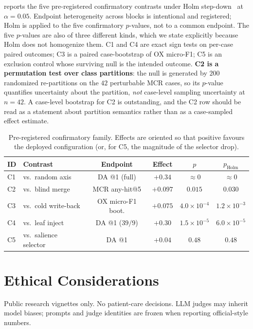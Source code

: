  reports the five pre-registered confirmatory contrasts under Holm step-down~\cite{holm1979} at $\alpha{=}0.05$.
Endpoint heterogeneity across blocks is intentional and registered; Holm is applied to the five confirmatory $p$-values, not to a common endpoint.
The five $p$-values are also of three different kinds, which we state explicitly because Holm does not homogenize them.
C1 and C4 are exact sign tests on per-case paired outcomes; C3 is a paired case-bootstrap of OX micro-F1; C5 is an exclusion control whose surviving null is the intended outcome.
\textbf{C2 is a permutation test over class partitions}: the null is generated by $200$ randomized re-partitions on the $42$ perturbable MCR cases, so its $p$-value quantifies uncertainty about the partition, \emph{not} case-level sampling uncertainty at $n{=}42$.
A case-level bootstrap for C2 is outstanding, and the C2 row should be read as a statement about partition semantics rather than as a case-sampled effect estimate.

\begin{table}[t]
\centering
\small
\caption{Pre-registered confirmatory family. Effects are oriented so that positive favours the deployed configuration (or, for C5, the magnitude of the selector drop).}
\label{tab:holm5}
\begin{tabular}{llcccc}
\toprule
ID & Contrast & Endpoint & Effect & $p$ & $p_{\mathrm{Holm}}$ \\
\midrule
C1 & vs.\ random axis & DA @1 (full) & $+0.34$ & ${\approx}0$ & ${\approx}0$ \\
C2 & vs.\ blind merge & MCR any-hit@5 & $+0.097$ & $0.015$ & $0.030$ \\
C3 & vs.\ cold write-back & OX micro-F1 boot. & $+0.075$ & $4.0{\times}10^{-4}$ & $1.2{\times}10^{-3}$ \\
C4 & vs.\ leaf inject & DA @1 ($39/9$) & $+0.30$ & $1.5{\times}10^{-5}$ & $6.0{\times}10^{-5}$ \\
C5 & vs.\ salience selector & DA @1 & $+0.04$ & $0.48$ & $0.48$ \\
\bottomrule
\end{tabular}
\end{table}

\section{Ethical Considerations}
\label{app:ethics}

Public research vignettes only.
No patient-care decisions.
LLM judges may inherit model biases; prompts and judge identities are frozen when reporting official-style numbers.
